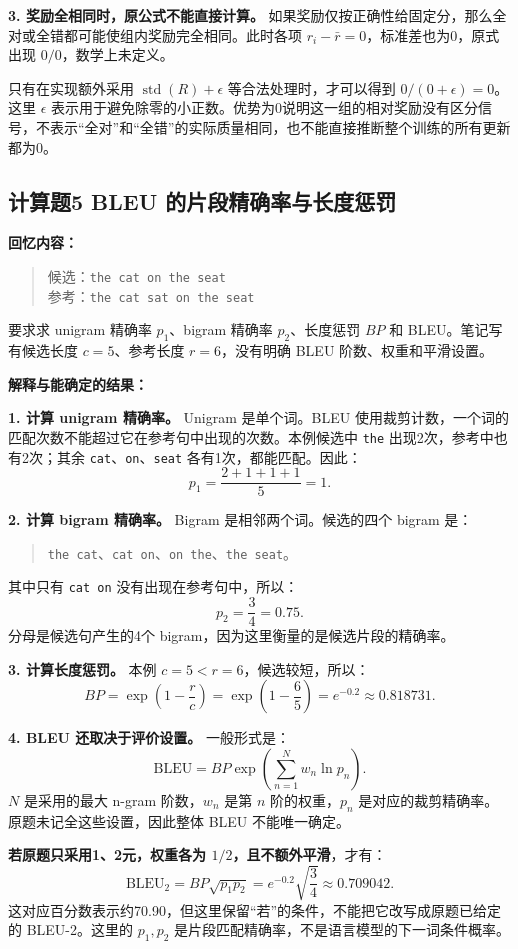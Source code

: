 \documentclass[UTF8,a4paper,zihao=-4,fontset=windows]{ctexart}
\newcommand{\recalled}[1]{\Needspace{8\baselineskip}\subsection*{#1}}
\begin{document}
\textbf{3. 奖励全相同时，原公式不能直接计算。}
如果奖励仅按正确性给固定分，那么全对或全错都可能使组内奖励完全相同。此时各项 $r_i-\bar r=0$，标准差也为0，原式出现 $0/0$，数学上未定义。

只有在实现额外采用 $\operatorname{std}(R)+\epsilon$ 等合法处理时，才可以得到 $0/(0+\epsilon)=0$。这里 $\epsilon$ 表示用于避免除零的小正数。优势为0说明这一组的相对奖励没有区分信号，不表示“全对”和“全错”的实际质量相同，也不能直接推断整个训练的所有更新都为0。

\recalled{计算题5 BLEU 的片段精确率与长度惩罚}

\textbf{回忆内容：}
\begin{quote}
候选：\texttt{the cat on the seat}\\
参考：\texttt{the cat sat on the seat}
\end{quote}
要求求 unigram 精确率 $p_1$、bigram 精确率 $p_2$、长度惩罚 $BP$ 和 BLEU。笔记写有候选长度 $c=5$、参考长度 $r=6$，没有明确 BLEU 阶数、权重和平滑设置。

\textbf{解释与能确定的结果：}

\textbf{1. 计算 unigram 精确率。}
Unigram 是单个词。BLEU 使用裁剪计数，一个词的匹配次数不能超过它在参考句中出现的次数。本例候选中 \texttt{the} 出现2次，参考中也有2次；其余 \texttt{cat}、\texttt{on}、\texttt{seat} 各有1次，都能匹配。因此：
\[
\boxed{p_1=\frac{2+1+1+1}{5}=1.}
\]

\textbf{2. 计算 bigram 精确率。}
Bigram 是相邻两个词。候选的四个 bigram 是：
\begin{quote}
\texttt{the cat}、\texttt{cat on}、\texttt{on the}、\texttt{the seat}。
\end{quote}
其中只有 \texttt{cat on} 没有出现在参考句中，所以：
\[
\boxed{p_2=\frac34=0.75.}
\]
分母是候选句产生的4个 bigram，因为这里衡量的是候选片段的精确率。

\textbf{3. 计算长度惩罚。}
本例 $c=5<r=6$，候选较短，所以：
\[
\boxed{BP=\exp\left(1-\frac rc\right)
=\exp\left(1-\frac65\right)
=e^{-0.2}\approx0.818731.}
\]

\textbf{4. BLEU 还取决于评价设置。}
一般形式是：
\[
\mathrm{BLEU}=BP\exp\left(\sum_{n=1}^{N}w_n\ln p_n\right).
\]
$N$ 是采用的最大 n-gram 阶数，$w_n$ 是第 $n$ 阶的权重，$p_n$ 是对应的裁剪精确率。原题未记全这些设置，因此整体 BLEU 不能唯一确定。

\textbf{若原题只采用1、2元，权重各为 $1/2$，且不额外平滑}，才有：
\[
\mathrm{BLEU}_2=BP\sqrt{p_1p_2}
=e^{-0.2}\sqrt{\frac34}\approx0.709042.
\]
这对应百分数表示约70.90，但这里保留“若”的条件，不能把它改写成原题已给定的 BLEU-2。这里的 $p_1,p_2$ 是片段匹配精确率，不是语言模型的下一词条件概率。
\end{document}
